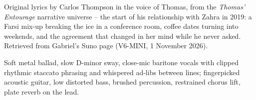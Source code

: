 
\label{sec:sincere}
\begin{notes}
Original lyrics by Carlos Thompson in the voice of Thomas, from the \emph{Thomas' Entourage} narrative universe -- the start of his relationship with Zahra in 2019: a Farsi mix-up breaking the ice in a conference room, coffee dates turning into weekends, and the agreement that changed in her mind while he never asked. Retrieved from Gabriel's Suno page (V6-MINI, 1 November 2026).
\end{notes}
\begin{style}
Soft metal ballad, slow D-minor sway, close-mic baritone vocals with clipped rhythmic staccato phrasing and whispered ad-libs between lines; fingerpicked acoustic guitar, low distorted bass, brushed percussion, restrained chorus lift, plate reverb on the lead.
\end{style}
